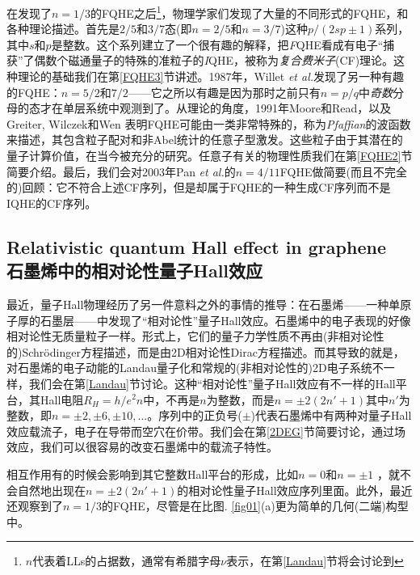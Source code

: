 \documentclass[10pt]{book}
\newcommand\itt{\it\color{blue}}
\begin{document}
在发现了$n=1/3$的FQHE之后\footnote{$n$代表着LLs的占据数，通常有希腊字母$\nu$表示，在第\ref{Landau}节将会讨论到}，物理学家们发现了大量的不同形式的FQHE，和各种理论描述。首先是$2/5$和$3/7$态(即$n=2/5$和$n=3/7$)这种$p/(2sp\pm 1)$系列，其中$s$和$p$是整数。这个系列建立了一个很有趣的解释，把{\sl F}QHE看成有电子``捕获''了偶数个磁通量子的特殊的准粒子的{\sl I}QHE，被称为{\itt 复合费米子}(CF)理论\cite{Jain1,Jain2}。这种理论的基础我们在第\ref{FQHE3}节讲述。1987年，Willet {\sl et al.}发现了另一种有趣的FQHE：$n=5/2$和$7/2$\cite{willett}——它之所以有趣是因为那时之前只有$n=p/q$中{\itt 奇数}分母的态才在单层系统中观测到了。从理论的角度，1991年Moore和Read\cite{MR}，以及Greiter, Wilczek和Wen \cite{GWW}表明FQHE可能由一类非常特殊的，称为{\sl Pfaffian}的波函数来描述，其包含粒子配对和非Abel统计的任意子型激发。这些粒子由于其潜在的量子计算价值，在当今被充分的研究。任意子有关的物理性质我们在第\ref{FQHE2}节简要介绍。最后，我们会对2003年Pan {\sl et al.}\cite{Pan}的$n=4/11$FQHE做简要(而且不完全的)回顾：它不符合上述CF序列，但是却属于FQHE的一种生成CF序列而不是IQHE的CF序列。


\subsection[石墨烯中的相对论性量子Hall效应]{Relativistic quantum Hall effect in graphene\\\bf 石墨烯中的相对论性量子Hall效应}

最近，量子Hall物理经历了另一件意料之外的事情的推导：在石墨烯——一种单原子厚的石墨层——中发现了``相对论性''量子Hall效应\cite{graph1,graph2}。石墨烯中的电子表现的好像相对论性无质量粒子一样。形式上，它们的量子力学性质不再由(非相对论性的)Schr\"odinger方程描述，而是由2D相对论性Dirac方程\cite{antonioRev}描述。而其导致的就是，对石墨烯的电子动能的Landau量子化和常规的(非相对论性的)2D电子系统不一样，我们会在第\ref{Landau}节讨论。这种``相对论性''量子Hall效应有不一样的Hall平台，其Hall电阻$R_H=h/e^2 n$中，不再是$n$为整数，而是$n=\pm 2(2n'+1)$其中$n'$为整数，即$n=\pm2, \pm6, \pm 10, ...$。序列中的正负号($\pm$)代表石墨烯中有两种对量子Hall效应载流子，电子在导带而空穴在价带。我们会在第\ref{2DEG}节简要讨论，通过场效应，我们可以很容易的改变石墨烯中的载流子特性。

相互作用有的时候会影响到其它整数Hall平台的形成，比如$n=0$和$n=\pm 1$ \cite{zhang}，就不会自然地出现在$n=\pm 2(2n'+1)$的相对论性量子Hall效应序列里面。此外，最近还观察到了$n=1/3$的FQHE，尽管是在比图. \ref{fig01}(a)更为简单的几何(二端)构型中\cite{grapheneFQHE1,grapheneFQHE2}。
\end{document}
